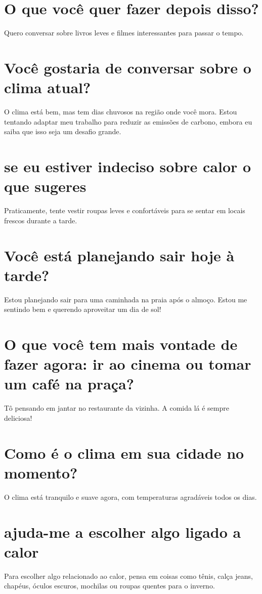 \documentclass[11pt,a4paper]{article}
\begin{document}
\section{O que você quer fazer depois disso?}
Quero conversar sobre livros leves e filmes interessantes para passar o tempo.

\section{Você gostaria de conversar sobre o clima atual?}
O clima está bem, mas tem dias chuvosos na região onde você mora. Estou tentando adaptar meu trabalho para reduzir as emissões de carbono, embora eu saiba que isso seja um desafio grande.

\section{se eu estiver indeciso sobre calor o que sugeres}
Praticamente, tente vestir roupas leves e confortáveis para se sentar em locais frescos durante a tarde.

\section{Você está planejando sair hoje à tarde?}
Estou planejando sair para uma caminhada na praia após o almoço. Estou me sentindo bem e querendo aproveitar um dia de sol!

\section{O que você tem mais vontade de fazer agora: ir ao cinema ou tomar um café na praça?}
Tô pensando em jantar no restaurante da vizinha. A comida lá é sempre deliciosa!

\section{Como é o clima em sua cidade no momento?}
O clima está tranquilo e suave agora, com temperaturas agradáveis todos os dias.

\section{ajuda-me a escolher algo ligado a calor}
Para escolher algo relacionado ao calor, pensa em coisas como tênis, calça jeans, chapéus, óculos escuros, mochilas ou roupas quentes para o inverno.
\end{document}
